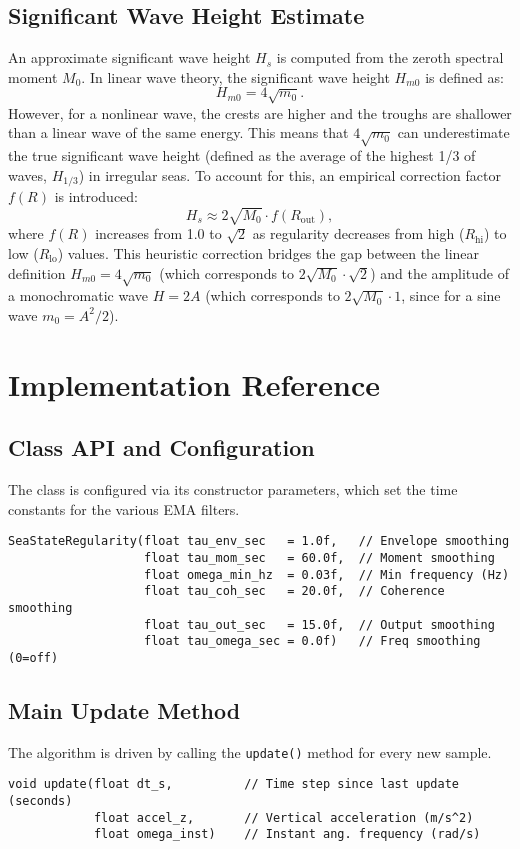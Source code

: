 \documentclass[11pt]{article}
\begin{document}
\subsection{Significant Wave Height Estimate}
An approximate significant wave height $H_s$ is computed from the zeroth spectral moment $M_0$. In linear wave theory, the significant wave height $H_{m0}$ is defined as:
\begin{equation}
H_{m0} = 4\sqrt{m_0}.
\end{equation}
However, for a nonlinear wave, the crests are higher and the troughs are shallower than a linear wave of the same energy. This means that $4\sqrt{m_0}$ can underestimate the true significant wave height (defined as the average of the highest 1/3 of waves, $H_{1/3}$) in irregular seas. To account for this, an empirical correction factor $f(R)$ is introduced:
\begin{equation}
H_s \approx 2 \sqrt{M_0} \cdot f(R_{\text{out}}),
\end{equation}
where $f(R)$ increases from 1.0 to $\sqrt{2}$ as regularity decreases from high ($R_{\text{hi}}$) to low ($R_{\text{lo}}$) values. This heuristic correction bridges the gap between the linear definition $H_{m0} = 4\sqrt{m_0}$ (which corresponds to $2\sqrt{M_0} \cdot \sqrt{2}$) and the amplitude of a monochromatic wave $H = 2A$ (which corresponds to $2\sqrt{M_0} \cdot 1$, since for a sine wave $m_0 = A^2/2$).

\section{Implementation Reference}
\subsection{Class API and Configuration}
The class is configured via its constructor parameters, which set the time constants for the various EMA filters.
\begin{lstlisting}[style=codestyle]
SeaStateRegularity(float tau_env_sec   = 1.0f,   // Envelope smoothing
                   float tau_mom_sec   = 60.0f,  // Moment smoothing
                   float omega_min_hz  = 0.03f,  // Min frequency (Hz)
                   float tau_coh_sec   = 20.0f,  // Coherence smoothing
                   float tau_out_sec   = 15.0f,  // Output smoothing
                   float tau_omega_sec = 0.0f)   // Freq smoothing (0=off)
\end{lstlisting}

\subsection{Main Update Method}
The algorithm is driven by calling the \texttt{update()} method for every new sample.
\begin{lstlisting}[style=codestyle]
void update(float dt_s,          // Time step since last update (seconds)
            float accel_z,       // Vertical acceleration (m/s^2)
            float omega_inst)    // Instant ang. frequency (rad/s)
\end{lstlisting}
\end{document}
